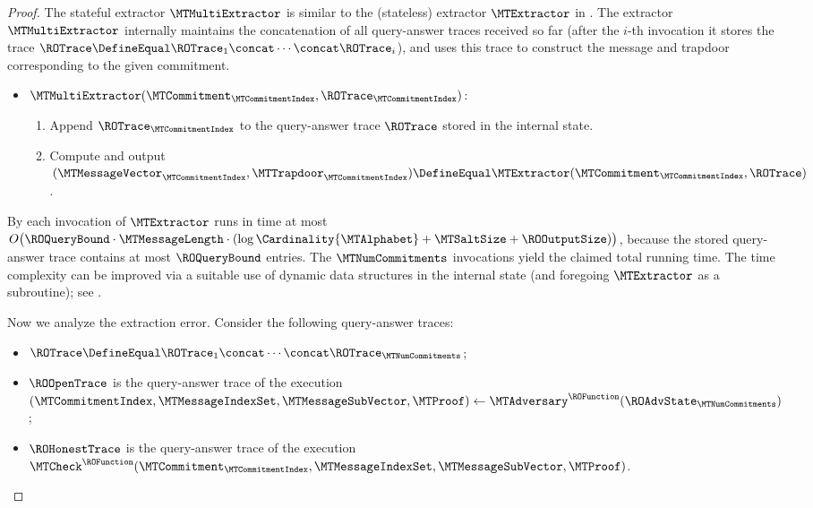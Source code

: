 \begin{proof}
The stateful extractor $\MTMultiExtractor$ is similar to the (stateless) extractor $\MTExtractor$ in . The extractor $\MTMultiExtractor$ internally maintains the concatenation of all query-answer traces received so far (after the $i$-th invocation it stores the trace $\ROTrace \DefineEqual \ROTrace_{1} \concat \cdots \concat \ROTrace_{i}$), and uses this trace to construct the message and trapdoor corresponding to the given commitment.
\begin{itemize}
\item[] $\MTMultiExtractor(\MTCommitment_{\MTCommitmentIndex},\ROTrace_{\MTCommitmentIndex})$:
\begin{enumerate}[nolistsep]
  \item Append $\ROTrace_{\MTCommitmentIndex}$ to the query-answer trace $\ROTrace$ stored in the internal state.
  \item Compute and output $(\MTMessageVector_{\MTCommitmentIndex},\MTTrapdoor_{\MTCommitmentIndex}) \DefineEqual \MTExtractor(\MTCommitment_{\MTCommitmentIndex},\ROTrace)$.
\end{enumerate}
\end{itemize}
By  each invocation of $\MTExtractor$ runs in time at most $O\big( \ROQueryBound \cdot \MTMessageLength \cdot (\log\Cardinality{\MTAlphabet} + \MTSaltSize + \ROOutputSize)\big)$, because the stored query-answer trace contains at most $\ROQueryBound$ entries. The $\MTNumCommitments$ invocations yield the claimed total running time. The time complexity can be improved via a suitable use of dynamic data structures in the internal state (and foregoing $\MTExtractor$ as a subroutine); see .

Now we analyze the extraction error. Consider the following query-answer traces:
\begin{itemize}[noitemsep]
  \item $\ROTrace \DefineEqual \ROTrace_{1} \concat \cdots \concat \ROTrace_{\MTNumCommitments}$;
  \item $\ROOpenTrace$ is the query-answer trace of the execution $(\MTCommitmentIndex, \MTMessageIndexSet,\MTMessageSubVector,\MTProof) \gets \MTAdversary^{\ROFunction}(\ROAdvState_{\MTNumCommitments})$;
  \item $\ROHonestTrace$ is the query-answer trace of the execution $\MTCheck^{\ROFunction}(\MTCommitment_{\MTCommitmentIndex},\MTMessageIndexSet,\MTMessageSubVector,\MTProof)$.
\end{itemize}


\end{proof}
